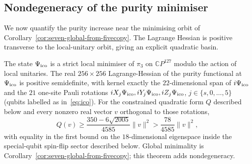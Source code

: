 \subsection{Nondegeneracy of the purity minimiser}\label{sec:seven-purity-nondegenerate}
We now quantify the purity increase near the minimising orbit of Corollary~\ref{cor:seven-global-from-fivecopy}.
The Lagrange Hessian is positive transverse to the local-unitary orbit, giving an explicit quadratic basin.

\begin{theorem}
\label{thm:icolocal}
The state $\Psi_{\mathrm{ico}}$ is a strict local minimiser of $\pi_3$ on
$\mathbb CP^{127}$ modulo the action of local unitaries. The real
$256\times256$ Lagrange-Hessian of the purity functional at $\Psi_{\mathrm{ico}}$ is
positive semidefinite, with kernel exactly the $22$-dimensional span
of $i\Psi_{\mathrm{ico}}$ and the $21$ one-site Pauli rotations
$iX_j\Psi_{\mathrm{ico}},iY_j\Psi_{\mathrm{ico}},iZ_j\Psi_{\mathrm{ico}}$, $j\in\{s,0,\ldots,5\}$ (qubits labelled as in~\eqref{eq:ico}).
For the constrained quadratic form $Q$ described below and every
nonzero real vector $v$ orthogonal to those rotations,
\[
             Q(v)\ge\frac{350-6\sqrt{2005}}{4585}\|v\|^2>\frac{78}{4585}\|v\|^2,
\]
with equality in the first bound on the $18$-dimensional eigenspace inside the special-qubit spin-flip sector described below.
Global minimality is Corollary~\ref{cor:seven-global-from-fivecopy}; this theorem adds nondegeneracy.
\end{theorem}
